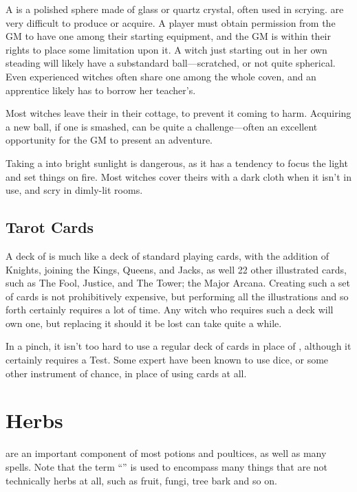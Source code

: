 A  is a polished sphere made of glass or quartz crystal, often used in scrying.
 are very difficult to produce or acquire.
A player must obtain permission from the GM to have one among their starting equipment, and the GM is within their rights to place some limitation upon it.
A witch just starting out in her own steading will likely have a substandard ball---scratched, or not quite spherical.
Even experienced witches often share one among the whole coven, and an apprentice likely has to borrow her teacher's.

Most witches leave their  in their cottage, to prevent it coming to harm.
Acquiring a new ball, if one is smashed, can be quite a challenge---often an excellent opportunity for the GM to present an adventure.

Taking a  into bright sunlight is dangerous, as it has a tendency to focus the light and set things on fire.
Most witches cover theirs with a dark cloth when it isn't in use, and scry in dimly-lit rooms.

\subsection{Tarot Cards}

A deck of  is much like a deck of standard playing cards, with the addition of Knights, joining the Kings, Queens, and Jacks, as well 22 other illustrated cards, such as The Fool, Justice, and The Tower; the Major Arcana.
Creating such a set of cards is not prohibitively expensive, but performing all the illustrations and so forth certainly requires a lot of time.
Any witch who requires such a deck will own one, but replacing it should it be lost can take quite a while.

In a pinch, it isn't too hard to use a regular deck of cards in place of , although it certainly requires a Test.
Some expert  have been known to use dice, or some other instrument of chance, in place of using cards at all.

\section{Herbs}

 are an important component of most potions and poultices, as well as many spells.
Note that the term ``'' is used to encompass many things that are not technically herbs at all, such as fruit, fungi, tree bark and so on.

